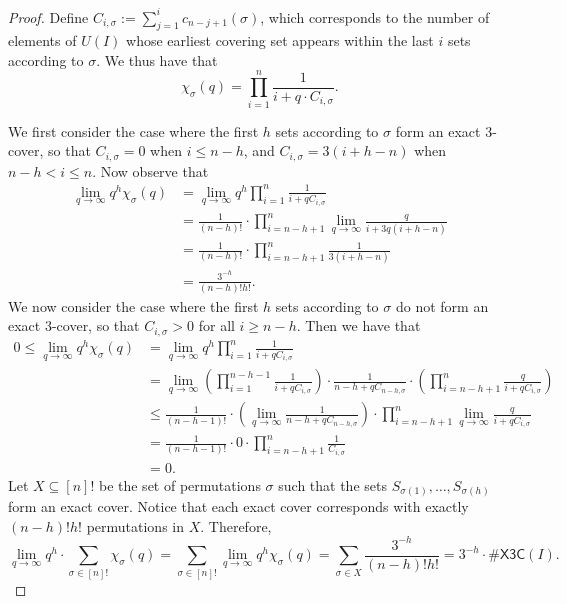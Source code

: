 \documentclass[11pt]{amsart}
\begin{document}
\begin{proof}

Define $C_{i, \sigma} := \sum_{j=1}^i c_{n-j+1}(\sigma)$, which corresponds to the number of elements of $U(I)$ whose earliest covering set appears within the last $i$ sets according to $\sigma$. We thus have that
\[
    \chi_{\sigma}(q) = \prod_{i=1}^n \frac{1}{i + q \cdot C_{i, \sigma}}.
\]

We first consider the case where the first $h$ sets according to $\sigma$ form an exact 3-cover, so that $C_{i, \sigma} = 0$ when $i \leq n-h$, and $C_{i, \sigma} = 3(i+h-n)$ when $n-h < i \leq n$. Now observe that
\begin{align*}
\lim_{q \to \infty} q^h \chi_{\sigma}(q) &= \lim_{q \to \infty} q^h \prod_{i=1}^n \frac{1}{i + q C_{i, \sigma}} \\ &= \frac{1}{(n-h)!} \cdot \prod_{i=n-h+1}^n\lim_{q \to \infty} \frac{q}{i+3q(i+h-n)} \\
&= \frac{1}{(n-h)!} \cdot \prod_{i=n-h+1}^n\frac{1}{3(i+h-n)} \\
&= \frac{3^{-h}}{(n-h)!h!}.
\end{align*}
We now consider the case where the first $h$ sets according to $\sigma$ do not form an exact 3-cover, so that $C_{i, \sigma} > 0$ for all $i \geq n-h$. Then we have that
\begin{align*}
0 \leq \lim_{q \to \infty} q^h \chi_{\sigma}(q) &= \lim_{q \to \infty} q^h \prod_{i=1}^n \frac{1}{i + q C_{i, \sigma}}\\
&=
\lim_{q \to \infty}\left(\prod_{i=1}^{n-h-1} \frac{1}{i+qC_{i, \sigma}}\right) \cdot \frac{1}{n-h + qC_{n-h, \sigma}}\cdot \left(\prod_{i=n-h+1}^n \frac{q}{i + q C_{i, \sigma}}\right)
\\ &\leq \frac{1}{(n-h-1)!} \cdot \left(\lim_{q \to \infty} \frac{1}{n-h+qC_{n-h, \sigma}} \right) \cdot \prod_{i=n-h+1}^n\lim_{q \to \infty} \frac{q}{i+qC_{i, \sigma}} \\
&= \frac{1}{(n-h-1)!} \cdot 0 \cdot \prod_{i=n-h+1}^n\frac{1}{C_{i, \sigma}} \\
&= 0.
\end{align*}
Let $X \subseteq [n]!$ be the set of permutations $\sigma$ such that the sets $S_{\sigma(1)}, \dots, S_{\sigma(h)}$ form an exact cover. Notice that each exact cover corresponds with exactly $(n-h)!h!$ permutations in $X$. Therefore,
\[
\lim_{q \to \infty} q^h \cdot \sum_{\sigma \in [n]!} \chi_{\sigma}(q) = \sum_{\sigma \in [n]!} \lim_{q \to \infty} q^h \chi_{\sigma}(q) = \sum_{\sigma \in X}{\frac{3^{-h}}{(n-h)!h!}} = 3^{-h} \cdot \#\mathsf{X3C}(I).
\]    
\end{proof}
\end{document}
